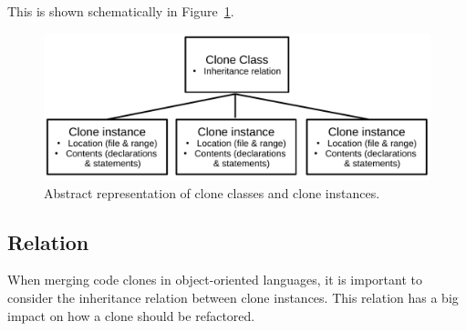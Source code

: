 \documentclass[runningheads]{llncs}
\begin{document}
This is shown schematically in Figure~\ref{fig:clonecontext}.

\begin{figure}[H]
  \centering
    \includegraphics[width=0.8\columnwidth]{img/context}
    \caption{Abstract representation of clone classes and clone instances.}
  \label{fig:clonecontext}
\end{figure}


\subsection{Relation}\label{sec:setuprelation}
When merging code clones in object-oriented languages, it is important to consider the inheritance relation between clone instances. This relation has a big impact on how a clone should be refactored.
\end{document}
